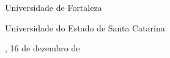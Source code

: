 \begin{folhadeaprovacao}
	\begin{center}
		\vspace*{-1.25cm}
		 \par
		\vspace{0.15cm}
		Universidade de Fortaleza
		
		 \par
		\vspace{0.15cm}
		Universidade do Estado de Santa Catarina

	
	\end{center}
    
    \vspace*{\fill}  
    \begin{center}
    {\imprimirlocal, 16 de dezembro de \imprimirdata} %
	\end{center}
    \vspace*{0.25cm}  
\end{folhadeaprovacao}




%	
%	
%	
%	
